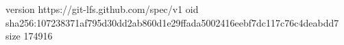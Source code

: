 version https://git-lfs.github.com/spec/v1
oid sha256:107238371af795d30dd2ab860d1e29ffada5002416eebf7dc117c76c4deabdd7
size 174916
